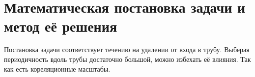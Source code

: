 \chapter{Математическая постановка задачи и метод её решения}



Постановка задачи соответствует течению на удалении от входа в трубу. Выберая периодичность вдоль трубы достаточно большой, можно избехать её влияния. Так как есть кореляционные масштабы. 
